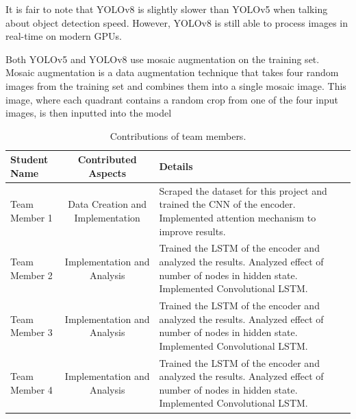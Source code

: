 \documentclass[10pt,twocolumn,letterpaper]{article}
\begin{document}
It is fair to note that YOLOv8 is slightly slower than YOLOv5 when talking about object detection speed. However, YOLOv8 is still able to process images in real-time on modern GPUs.

Both YOLOv5 and YOLOv8 use mosaic augmentation on the training set. Mosaic augmentation is a data augmentation technique that takes four random images from the training set and combines them into a single mosaic image. This image, where each quadrant contains a random crop from one of the four input images, is then inputted into the model ~\cite{MosaicAug}

\newpage
\newpage

														 
{\small


}

\begin{table}
\begin{center}			  
\begin{tabular}{|l|c|p{8cm}|}
\hline
Student Name & Contributed Aspects & Details \\
\hline\hline
Team Member 1 & Data Creation and Implementation & Scraped the dataset for this project and trained the CNN of the encoder. Implemented attention mechanism to improve results. \\
Team Member 2 & Implementation and Analysis & Trained the LSTM of the encoder and analyzed the results. Analyzed effect of number of nodes in hidden state.  Implemented Convolutional LSTM. \\
Team Member 3 & Implementation and Analysis & Trained the LSTM of the encoder and analyzed the results. Analyzed effect of number of nodes in hidden state.  Implemented Convolutional LSTM. \\
Team Member 4 & Implementation and Analysis & Trained the LSTM of the encoder and analyzed the results. Analyzed effect of number of nodes in hidden state.  Implemented Convolutional LSTM. \\
\hline
\end{tabular}
\end{center}
\caption{Contributions of team members.}
\label{tab:contributions}
\end{table}
\end{document}
